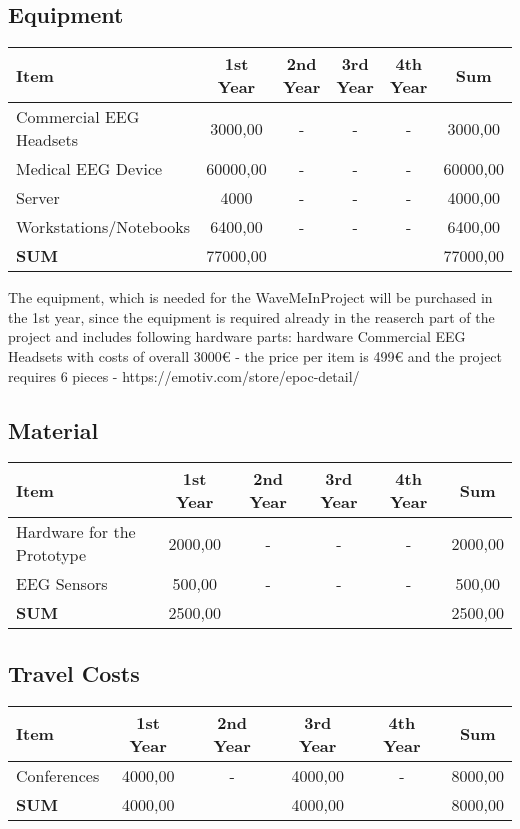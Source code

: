 \subsection{Equipment}
\begin{tabular}{|l|c|c|c|c|c|}
\hline 
Item & 1st Year & 2nd Year & 3rd Year & 4th Year & Sum \\ 
\hline 
Commercial EEG Headsets & 3000,00 & - & - & - & 3000,00 \\ 
\hline 
Medical EEG Device & 60000,00 & - & - & - & 60000,00 \\ 
\hline 
Server & 4000 & - & - & - & 4000,00 \\ 
\hline 
Workstations/Notebooks & 6400,00 & - & - & - & 6400,00 \\ 
\hline 
\textbf{SUM} & 77000,00 &  &  &  & 77000,00 \\ 
\hline 
\end{tabular}

The equipment, which is needed for the WaveMeInProject will be purchased in the 1st year, since the equipment is required already in the reaserch part of the project and includes following hardware parts:
hardware Commercial EEG Headsets with costs of overall 3000\euro{} - the price per item is 499\euro{} and the project requires 6 pieces - https://emotiv.com/store/epoc-detail/


\subsection{Material}
\begin{tabular}{|l|c|c|c|c|c|}
\hline 
Item & 1st Year & 2nd Year & 3rd Year & 4th Year & Sum \\ 
\hline 
Hardware for the Prototype & 2000,00 & - & - & - & 2000,00 \\ 
\hline 
EEG Sensors & 500,00 & - & - & - & 500,00 \\ 
\hline 
\textbf{SUM} & 2500,00 &  &  &  & 2500,00 \\ 
\hline 
\end{tabular} 

\subsection{Travel Costs}
\begin{tabular}{|l|c|c|c|c|c|}
\hline 
Item & 1st Year & 2nd Year & 3rd Year & 4th Year & Sum \\ 
\hline 
Conferences & 4000,00 & - & 4000,00 & - & 8000,00 \\ 
\hline 
\textbf{SUM} & 4000,00 &  & 4000,00 &  & 8000,00 \\ 
\hline 
\end{tabular} 

